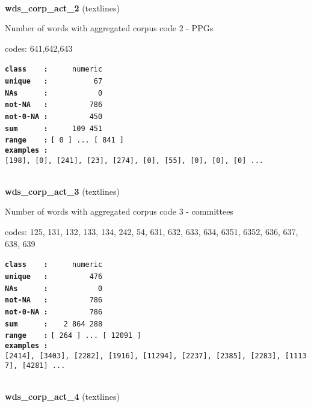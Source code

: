 \documentclass[]{article}
\begin{document}
~

\textbf{wds\_corp\_act\_2} (textlines)

Number of words with aggregated corpus code 2 - PPGs

codes: 641,642,643

\textbf{\texttt{class\ \ \ \ :}} \texttt{~~~~~numeric}\\
\textbf{\texttt{unique\ \ \ :}} \texttt{~~~~~~~~~~67}\\
\textbf{\texttt{NAs\ \ \ \ \ \ :}} \texttt{~~~~~~~~~~~0}\\
\textbf{\texttt{not-NA\ \ \ :}} \texttt{~~~~~~~~~786}\\
\textbf{\texttt{not-0-NA\ :}} \texttt{~~~~~~~~~450}\\
\textbf{\texttt{sum\ \ \ \ \ \ :}} \texttt{~~~~~109~451}\\
\textbf{\texttt{range\ \ \ \ :}}
\texttt{{[}\ 0\ {]}\ ...\ {[}\ 841\ {]}}\\
\textbf{\texttt{examples\ :}}
\texttt{{[}198{]},\ {[}0{]},\ {[}241{]},\ {[}23{]},\ {[}274{]},\ {[}0{]},\ {[}55{]},\ {[}0{]},\ {[}0{]},\ {[}0{]}\ ...}\\

~

\textbf{wds\_corp\_act\_3} (textlines)

Number of words with aggregated corpus code 3 - committees

codes: 125, 131, 132, 133, 134, 242, 54, 631, 632, 633, 634, 6351, 6352,
636, 637, 638, 639

\textbf{\texttt{class\ \ \ \ :}} \texttt{~~~~~numeric}\\
\textbf{\texttt{unique\ \ \ :}} \texttt{~~~~~~~~~476}\\
\textbf{\texttt{NAs\ \ \ \ \ \ :}} \texttt{~~~~~~~~~~~0}\\
\textbf{\texttt{not-NA\ \ \ :}} \texttt{~~~~~~~~~786}\\
\textbf{\texttt{not-0-NA\ :}} \texttt{~~~~~~~~~786}\\
\textbf{\texttt{sum\ \ \ \ \ \ :}} \texttt{~~~2~864~288}\\
\textbf{\texttt{range\ \ \ \ :}}
\texttt{{[}\ 264\ {]}\ ...\ {[}\ 12091\ {]}}\\
\textbf{\texttt{examples\ :}}
\texttt{{[}2414{]},\ {[}3403{]},\ {[}2282{]},\ {[}1916{]},\ {[}11294{]},\ {[}2237{]},\ {[}2385{]},\ {[}2283{]},\ {[}11137{]},\ {[}4281{]}\ ...}\\

~

\textbf{wds\_corp\_act\_4} (textlines)
\end{document}
